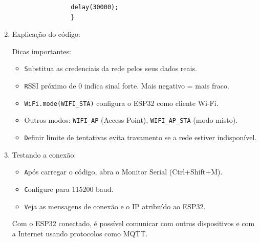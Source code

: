 \documentclass[a4paper]{article}
\begin{document}
\begin{answer}
\begin{enumerate}
\begin{verbatim}
                delay(30000);
                }
            \end{verbatim}
        
            \item Explicação do código:

                Dicas importantes:
                \begin{itemize}
                        \item \texttt Substitua as credenciais da rede pelos seus dados reais.
                        \item \texttt RSSI próximo de 0 indica sinal forte. Mais negativo = mais fraco.
                        \item \texttt{WiFi.mode(WIFI\_STA)} configura o ESP32 como cliente Wi-Fi.
                        \item Outros modos: \texttt{WIFI\_AP} (Access Point), \texttt{WIFI\_AP\_STA} (modo misto).
                        \item \texttt Definir limite de tentativas evita travamento se a rede estiver indisponível.
                    \end{itemize}

            \item Testando a conexão:
            
                \begin{itemize}
                    \item \texttt Após carregar o código, abra o Monitor Serial (Ctrl+Shift+M).
                    \item \texttt Configure para 115200 baud.
                    \item \texttt Veja as mensagens de conexão e o IP atribuído ao ESP32.
                \end{itemize}
                
            Com o ESP32 conectado, é possível comunicar com outros dispositivos e com a Internet usando protocolos como MQTT.
        \end{enumerate}
    \end{answer}
\end{document}
